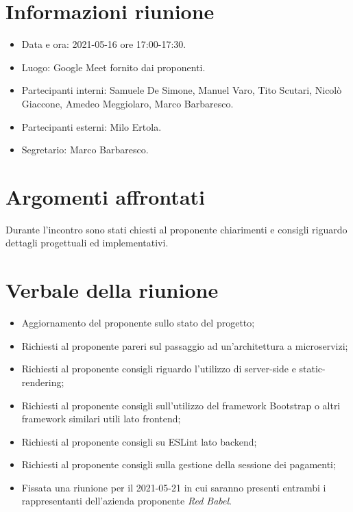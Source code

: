 \documentclass[a4paper]{article}
\begin{document}
\newpage
\tableofcontents
\newpage

\section{Informazioni riunione}
\begin{itemize}
    \item Data e ora: 2021-05-16 ore 17:00-17:30.
    \item Luogo: Google Meet fornito dai proponenti.
    \item Partecipanti interni: Samuele De Simone, Manuel Varo, Tito Scutari, Nicolò Giaccone, Amedeo Meggiolaro, Marco Barbaresco.
    \item Partecipanti esterni: Milo Ertola.
    \item Segretario: Marco Barbaresco.
\end{itemize}
\section{Argomenti affrontati}
Durante l'incontro sono stati chiesti al proponente chiarimenti e consigli riguardo dettagli progettuali ed implementativi.
\section{Verbale della riunione}
\begin{itemize}
    \item Aggiornamento del proponente sullo stato del progetto;
    \item Richiesti al proponente pareri sul passaggio ad un'architettura a microservizi;
    \item Richiesti al proponente consigli riguardo l'utilizzo di server-side e static-rendering;
    \item Richiesti al proponente consigli sull'utilizzo del framework Bootstrap o altri framework similari utili lato frontend;
    \item Richiesti al proponente consigli su ESLint lato backend;
    \item Richiesti al proponente consigli sulla gestione della sessione dei pagamenti;
    \item Fissata una riunione per il 2021-05-21 in cui saranno presenti entrambi i rappresentanti dell'azienda proponente \textit{Red Babel}.
\end{itemize}
\newpage
\end{document}
